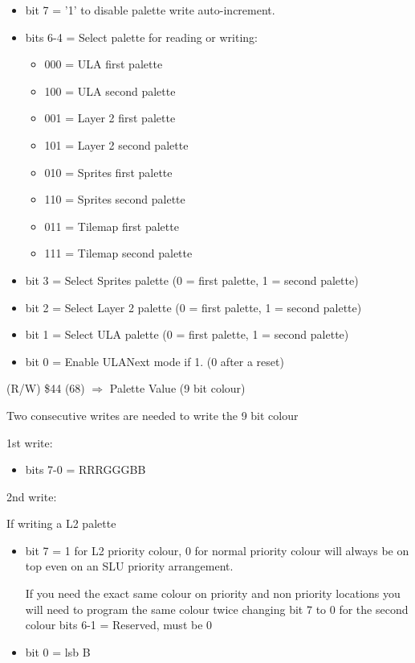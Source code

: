 \begin{itemize}
\item bit 7 = '1' to disable palette write auto-increment.
\item bits 6-4 = Select palette for reading or writing:
  \begin{itemize}
  \item 000 = ULA first palette
  \item 100 = ULA second palette
  \item 001 = Layer 2 first palette
  \item 101 = Layer 2 second palette
  \item 010 = Sprites first palette 
  \item 110 = Sprites second palette
  \item 011 = Tilemap first palette
  \item 111 = Tilemap second palette
  \end{itemize}
\item bit 3 = Select Sprites palette (0 = first palette, 1 = second palette)
\item bit 2 = Select Layer 2 palette (0 = first palette, 1 = second palette)
\item bit 1 = Select ULA palette (0 = first palette, 1 = second palette)
\item bit 0 = Enable ULANext mode if 1. (0 after a reset)
\end{itemize}
(R/W) \$44 (68) $\Rightarrow$ Palette Value (9 bit colour)

Two consecutive writes are needed to write the 9 bit colour

1st write:

\begin{itemize}
\item bits 7-0 = RRRGGGBB
\end{itemize}

2nd write: 

If writing a L2 palette

\hrulefill
\begin{itemize}
\item bit 7 = 1 for L2 priority colour, 0 for normal priority colour will always be on top even on an SLU priority arrangement. 

If you need the exact same colour on priority and non priority
locations you will need to program the same colour twice changing bit
7 to 0 for the second colour bits 6-1 = Reserved, must be 0

\item bit 0 = lsb B
\end{itemize}
     
